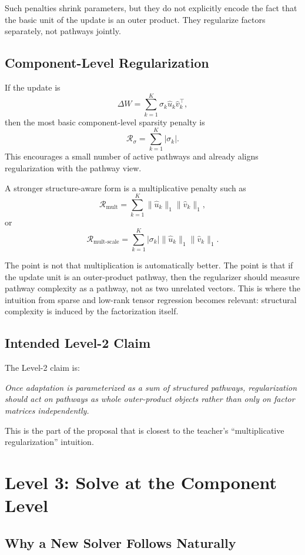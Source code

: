 \documentclass[11pt]{article}
\begin{document}
Such penalties shrink parameters, but they do not explicitly encode the fact that the basic unit of the update is an outer product. They regularize factors separately, not pathways jointly.

\subsection{Component-Level Regularization}

If the update is
\[
\Delta W = \sum_{k=1}^{K} \sigma_k \hat{u}_k \hat{v}_k^\top,
\]
then the most basic component-level sparsity penalty is
\[
\mathcal{R}_{\sigma} = \sum_{k=1}^{K} |\sigma_k|.
\]
This encourages a small number of active pathways and already aligns regularization with the pathway view.

A stronger structure-aware form is a multiplicative penalty such as
\[
\mathcal{R}_{\text{mult}}
=
\sum_{k=1}^{K}
\|\hat{u}_k\|_1 \|\hat{v}_k\|_1,
\]
or
\[
\mathcal{R}_{\text{mult-scale}}
=
\sum_{k=1}^{K}
|\sigma_k| \|\hat{u}_k\|_1 \|\hat{v}_k\|_1.
\]

The point is not that multiplication is automatically better. The point is that if the update unit is an outer-product pathway, then the regularizer should measure pathway complexity as a pathway, not as two unrelated vectors. This is where the intuition from sparse and low-rank tensor regression becomes relevant: structural complexity is induced by the factorization itself.

\subsection{Intended Level-2 Claim}

The Level-2 claim is:

\emph{Once adaptation is parameterized as a sum of structured pathways, regularization should act on pathways as whole outer-product objects rather than only on factor matrices independently.}

This is the part of the proposal that is closest to the teacher's ``multiplicative regularization'' intuition.

\section{Level 3: Solve at the Component Level}

\subsection{Why a New Solver Follows Naturally}
\end{document}
